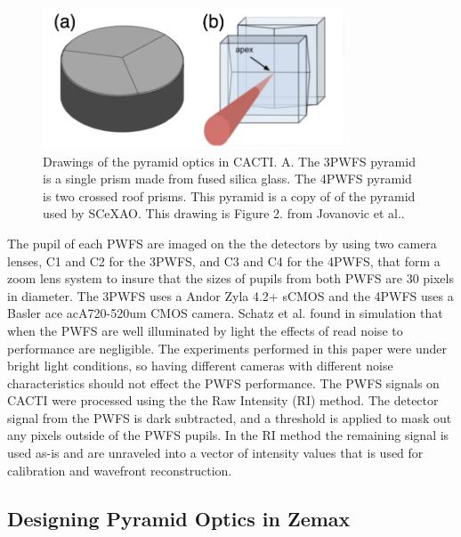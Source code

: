 \begin{figure}
    \centering
    \includegraphics[width=0.8\textwidth]{Chapter Materials/Chapter Five Materials/pyramidOptics.png}
    \caption{Drawings of the pyramid optics in CACTI. A. The 3PWFS pyramid is a single prism made from fused silica glass. The 4PWFS pyramid is two crossed roof prisms. This pyramid is a copy of of the pyramid used by SCeXAO. This drawing is Figure 2. from Jovanovic et al.\cite{jovanovic2016scexao}. }
    \label{fig:pyramidOptics}
\end{figure}


The pupil of each PWFS are imaged on the the detectors by using two camera lenses, C1 and C2 for the 3PWFS, and C3 and C4 for the 4PWFS,  that form a zoom lens system to insure that the sizes of pupils from both PWFS are 30 pixels in diameter. The 3PWFS uses a Andor Zyla 4.2+ sCMOS and the 4PWFS uses a Basler ace acA720-520um CMOS camera. Schatz et al. found in simulation that when the PWFS are well illuminated by light the effects of read noise to performance are negligible. The experiments performed in this paper were under bright light conditions, so having different cameras with different noise characteristics should not effect the PWFS performance. The PWFS signals on CACTI were processed using the the Raw Intensity (RI) method. The detector signal from the PWFS is dark subtracted, and a threshold is applied to mask out any pixels outside of the PWFS pupils. In the RI method the remaining signal is used as-is and are unraveled into a vector of intensity values that is used for calibration and wavefront reconstruction.


\subsection{Designing Pyramid Optics in Zemax}

